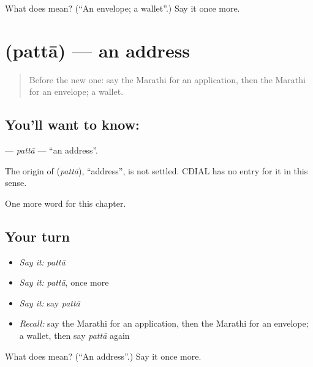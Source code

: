 \begin{tcolorbox}[breakable,colback=teal!4,colframe=teal!35!black,title={Before you move on}]
What does  mean? (\textquotedblleft{}An envelope; a wallet\textquotedblright{}.) Say it once more.
\end{tcolorbox}
\section[\texorpdfstring{\mr{पत्ता} (pattā)}{पत्ता (pattā)}]{ (pattā) — an address}

\label{lesson:MR-C212-patta}



\begin{quote}
Before the new one: say the Marathi for an application, then the Marathi for an envelope; a wallet.
\end{quote}

\subsection*{You'll want to know: }
\textbf{} — \emph{pattā} — \textquotedblleft{}an address\textquotedblright{}.

\begin{cousinweb}
The origin of \textbf{} (\emph{pattā}), \textquotedblleft{}address\textquotedblright{}, is not settled. CDIAL has no entry for it in this sense.
\end{cousinweb}

\begin{grammarlens}[title={What you've built}]
One more word for this chapter.
\end{grammarlens}

\subsection*{Your turn}
\begin{itemize}
\raggedright
  \item \emph{Say it:} \emph{pattā}
  \item \emph{Say it:} \emph{pattā}, once more
  \item \emph{Say it:} say \emph{pattā}
  \item \emph{Recall:} say the Marathi for an application, then the Marathi for an envelope; a wallet, then say \emph{pattā} again
\end{itemize}

\begin{tcolorbox}[breakable,colback=teal!4,colframe=teal!35!black,title={Before you move on}]
What does  mean? (\textquotedblleft{}An address\textquotedblright{}.) Say it once more.
\end{tcolorbox}
